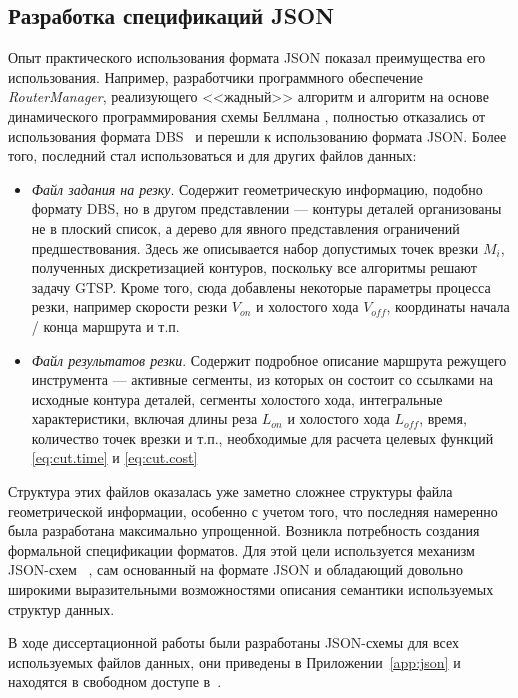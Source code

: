 \subsection{Разработка спецификаций JSON}

Опыт практического использования
формата JSON показал преимущества его
использования.
Например,
разработчики
программного обеспечение \textit{RouterManager},
реализующего <<жадный>> алгоритм
\cite{bi:greedy}
и алгоритм на основе динамического программирования
схемы Беллмана
\cite{bi:RoMa},
полностью отказались от использования формата
DBS~\cite{bi:DBS}
и перешли к использованию формата JSON.
Более того,
последний стал использоваться и для других файлов данных:

\begin{itemize}
  \item \textit{Файл задания на резку}.
  Содержит геометрическую информацию,
  подобно формату DBS,
  но в другом представлении ---
  контуры деталей организованы
  не в плоский список,
  а дерево для явного представления
  ограничений предшествования.
  Здесь же описывается набор допустимых
  точек врезки $M_i$,
  полученных дискретизацией контуров,
  поскольку все алгоритмы решают задачу GTSP.
  Кроме того,
  сюда добавлены некоторые параметры
  процесса резки,
  например скорости резки
  $V_{on}$
  и холостого хода
  $V_{off}$,
  координаты начала / конца маршрута и т.п.
  \item \textit{Файл результатов резки}.
  Содержит подробное описание маршрута режущего
  инструмента --- активные сегменты,
  из которых он состоит со ссылками
  на исходные контура деталей,
  сегменты холостого хода,
  интегральные характеристики,
  включая длины реза
  $L_{on}$
  и холостого хода
  $L_{off}$,
  время, количество точек врезки и т.п.,
  необходимые для расчета целевых функций
  \eqref{eq:cut.time} и \eqref{eq:cut.cost}
\end{itemize}

Структура этих файлов оказалась уже заметно сложнее
структуры файла геометрической информации,
особенно с учетом того,
что последняя намеренно была разработана
максимально упрощенной.
Возникла потребность создания формальной спецификации
форматов.
Для этой цели используется механизм
JSON-схем~
\cite{bi:json-schema},
сам основанный на формате JSON
и обладающий довольно широкими
выразительными возможностями
описания семантики используемых
структур данных.

В ходе диссертационной работы были
разработаны JSON-схемы для всех
используемых файлов данных,
они приведены в Приложении~\ref{app:json}
и находятся в свободном доступе в~\cite{bi:dbs-schema}.

